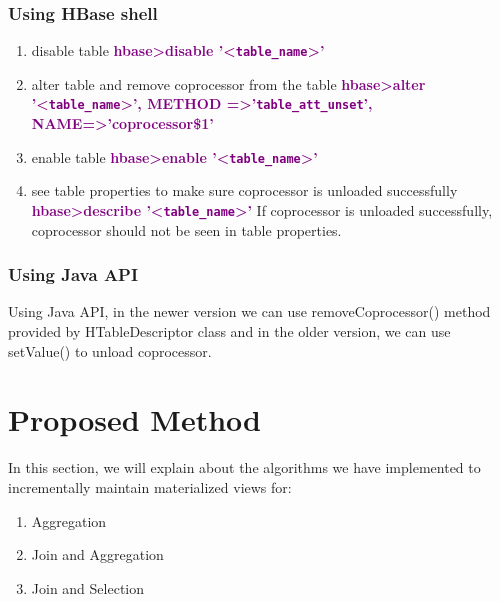\documentclass[11pt,a4paper,bibtotoc,idxtotoc,headsepline,footsepline,footexclude,BCOR12mm,DIV13]{scrbook}
\begin{document}
\subsubsection{Using HBase shell}
\begin{enumerate}
    \item disable table \newline
    \textbf{\textcolor{purple}{hbase\textgreater disable '\textless \texttt{table\_name}\textgreater'}}
    \item alter table and remove coprocessor from the table \newline
    \textbf{\textcolor{purple}{hbase\textgreater alter '\textless \texttt{table\_name}\textgreater', 
    METHOD =\textgreater '\texttt{table\_att\_unset}', NAME=\textgreater 'coprocessor\$1' }}
    \item enable table \newline
    \textbf{\textcolor{purple}{hbase\textgreater enable '\textless \texttt{table\_name}\textgreater'}}
    \item see table properties to make sure coprocessor is unloaded successfully \newline\textbf{\textcolor{purple}{hbase\textgreater describe '\textless \texttt{table\_name}\textgreater'}} \newline
    If coprocessor is unloaded successfully, coprocessor should not be seen in table properties.
     
\end{enumerate}

\subsubsection{Using Java API}
Using Java API, in the newer version we can use removeCoprocessor() method provided by HTableDescriptor class and in the older version, we can use setValue() to unload coprocessor.

\section{Proposed Method}
In this section, we will explain about the algorithms we have implemented to incrementally maintain materialized views for: 
\begin{enumerate}
    \item Aggregation
    \item Join and Aggregation
    \item Join and Selection
\end{enumerate}
\end{document}
